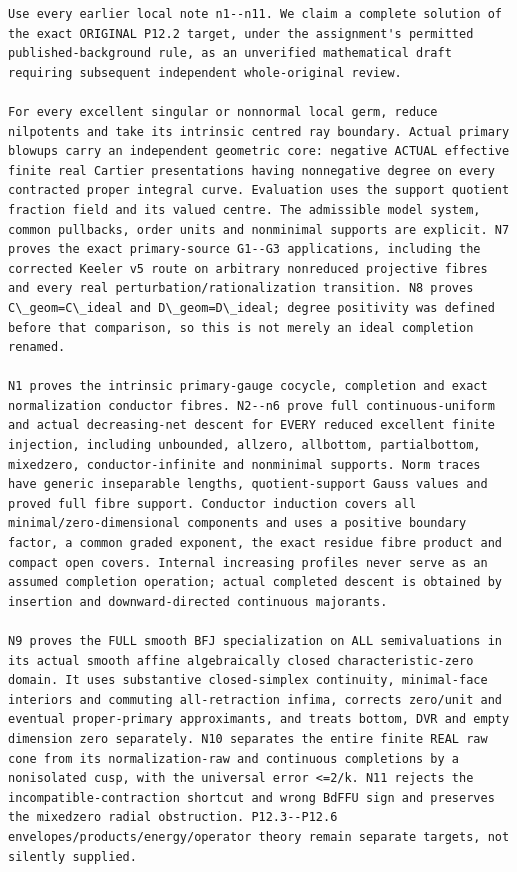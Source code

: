 \documentclass[11pt]{article}
\begin{document}
\begin{Verbatim}[fontsize=\tiny,breaklines=true,breakanywhere=true]
Use every earlier local note n1--n11. We claim a complete solution of the exact ORIGINAL P12.2 target, under the assignment's permitted published-background rule, as an unverified mathematical draft requiring subsequent independent whole-original review.

For every excellent singular or nonnormal local germ, reduce nilpotents and take its intrinsic centred ray boundary. Actual primary blowups carry an independent geometric core: negative ACTUAL effective finite real Cartier presentations having nonnegative degree on every contracted proper integral curve. Evaluation uses the support quotient fraction field and its valued centre. The admissible model system, common pullbacks, order units and nonminimal supports are explicit. N7 proves the exact primary-source G1--G3 applications, including the corrected Keeler v5 route on arbitrary nonreduced projective fibres and every real perturbation/rationalization transition. N8 proves C\_geom=C\_ideal and D\_geom=D\_ideal; degree positivity was defined before that comparison, so this is not merely an ideal completion renamed.

N1 proves the intrinsic primary-gauge cocycle, completion and exact normalization conductor fibres. N2--n6 prove full continuous-uniform and actual decreasing-net descent for EVERY reduced excellent finite injection, including unbounded, allzero, allbottom, partialbottom, mixedzero, conductor-infinite and nonminimal supports. Norm traces have generic inseparable lengths, quotient-support Gauss values and proved full fibre support. Conductor induction covers all minimal/zero-dimensional components and uses a positive boundary factor, a common graded exponent, the exact residue fibre product and compact open covers. Internal increasing profiles never serve as an assumed completion operation; actual completed descent is obtained by insertion and downward-directed continuous majorants.

N9 proves the FULL smooth BFJ specialization on ALL semivaluations in its actual smooth affine algebraically closed characteristic-zero domain. It uses substantive closed-simplex continuity, minimal-face interiors and commuting all-retraction infima, corrects zero/unit and eventual proper-primary approximants, and treats bottom, DVR and empty dimension zero separately. N10 separates the entire finite REAL raw cone from its normalization-raw and continuous completions by a nonisolated cusp, with the universal error <=2/k. N11 rejects the incompatible-contraction shortcut and wrong BdFFU sign and preserves the mixedzero radial obstruction. P12.3--P12.6 envelopes/products/energy/operator theory remain separate targets, not silently supplied.


\end{Verbatim}
\end{document}
